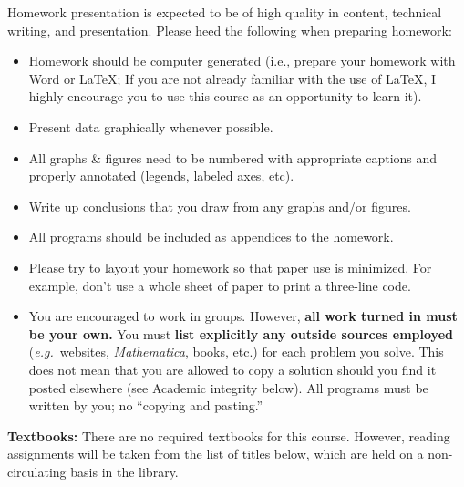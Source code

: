 \documentclass{article}
\begin{document}
Homework presentation is expected to be of high quality in content,
technical writing, and presentation.   Please heed the following
when preparing homework:

\vspace{-0.1in}
\begin{itemize}

\item Homework should be computer generated (i.e., prepare your homework
with Word or LaTeX;  If you are not already familiar with the use of LaTeX,
I highly encourage you to use this course as an opportunity to learn it).

\item Present data graphically whenever possible. 

\item All graphs \& figures need to be numbered with appropriate captions
and properly annotated (legends, labeled axes, etc).  

\item Write up conclusions that you draw from any graphs and/or figures.

\item All programs should be included as appendices to the homework.  

\item Please try to layout your homework so that paper use is minimized. For
example, don't use a whole sheet of paper to print a three-line code.

\item You are encouraged to work in groups. However, \textbf{all work turned
in must be your own.} You must \textbf{list explicitly any outside sources
employed} (\textit{e.g.}\ websites, \textit{Mathematica}, books, etc.) for
each problem you solve.  This does not mean that you are allowed to copy a
solution should you find it posted elsewhere (see Academic integrity below).
All programs must be written by you; no ``copying and pasting.''

\end{itemize}

\textbf{Textbooks:} There are no required textbooks for this course.
However, reading assignments will be taken from the list of titles below,
which are held on a non-circulating basis in the library. 
\end{document}
